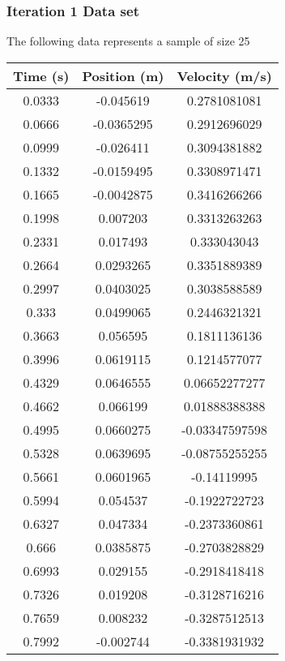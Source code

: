 \documentclass{report}
\begin{document}
     \subsubsection{Iteration 1 Data set}
     \bigbreak \noindent 
     The following data represents a sample of size 25
     \bigbreak \noindent 
     \begin{center}
         \begin{tabular}{c|c|c}
             Time (s) & Position (m) & Velocity (m/s) \\
             \hline
             0.0333	&-0.045619	&0.2781081081\\
             0.0666	&-0.0365295	&0.2912696029\\
             0.0999	&-0.026411	&0.3094381882\\
             0.1332	&-0.0159495	&0.3308971471\\
             0.1665	&-0.0042875	&0.3416266266\\
             0.1998	&0.007203	&0.3313263263\\
             0.2331	&0.017493	&0.333043043\\
             0.2664	&0.0293265	&0.3351889389\\
             0.2997	&0.0403025	&0.3038588589\\
             0.333	&0.0499065	&0.2446321321\\
             0.3663	&0.056595	&0.1811136136\\
             0.3996	&0.0619115	&0.1214577077\\
             0.4329	&0.0646555	&0.06652277277\\
             0.4662	&0.066199	&0.01888388388\\
             0.4995	&0.0660275	&-0.03347597598\\
             0.5328	&0.0639695	&-0.08755255255\\
             0.5661	&0.0601965	&-0.14119995\\
             0.5994	&0.054537	&-0.1922722723\\
             0.6327	&0.047334	&-0.2373360861\\
             0.666	&0.0385875	&-0.2703828829\\
             0.6993	&0.029155	&-0.2918418418\\
             0.7326	&0.019208	&-0.3128716216\\
             0.7659	&0.008232	&-0.3287512513\\
             0.7992	&-0.002744	&-0.3381931932
         \end{tabular}
     \end{center}
\end{document}
